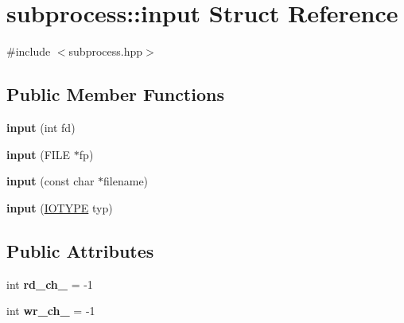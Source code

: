 \hypertarget{structsubprocess_1_1input}{}\section{subprocess\+:\+:input Struct Reference}
\label{structsubprocess_1_1input}


{\ttfamily \#include $<$subprocess.\+hpp$>$}

\subsection*{Public Member Functions}
\begin{DoxyCompactItemize}
\item 
\mbox{\label{structsubprocess_1_1input_ab89e2b0059371939d0bdd8c3c880b44a}} 
{\bfseries input} (int fd)
\item 
\mbox{\label{structsubprocess_1_1input_a8f37206d741d5c78af362463b8aceeee}} 
{\bfseries input} (F\+I\+LE $\ast$fp)
\item 
\mbox{\label{structsubprocess_1_1input_a7162f3da7aa3657348aff97441cd748c}} 
{\bfseries input} (const char $\ast$filename)
\item 
\mbox{\label{structsubprocess_1_1input_a78c5a72973cf9cc696e5d30caa86f53b}} 
{\bfseries input} (\hyperlink{namespacesubprocess_a8c21131feb99bed9ffa644851ff499ed}{I\+O\+T\+Y\+PE} typ)
\end{DoxyCompactItemize}
\subsection*{Public Attributes}
\begin{DoxyCompactItemize}
\item 
\mbox{\label{structsubprocess_1_1input_a3b571a86a9b1001f46a7dd817db2bbf4}} 
int {\bfseries rd\+\_\+ch\+\_\+} = -\/1
\item 
\mbox{\label{structsubprocess_1_1input_a973c2f79b599528217461350782b58f5}} 
int {\bfseries wr\+\_\+ch\+\_\+} = -\/1
\end{DoxyCompactItemize}


